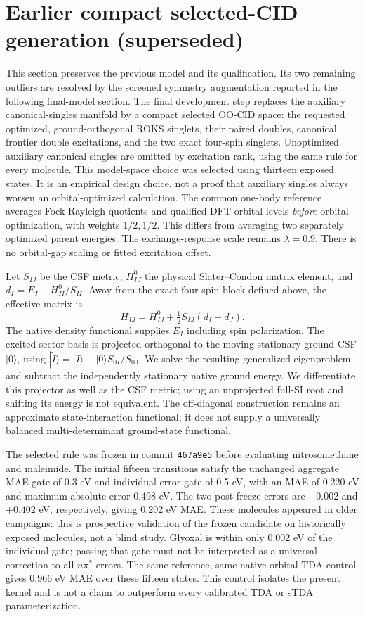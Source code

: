 \section{Earlier compact selected-CID generation (superseded)}
This section preserves the previous model and its qualification. Its two
remaining outliers are resolved by the screened symmetry augmentation
reported in the following final-model section.
The final development step replaces the auxiliary canonical-singles manifold
by a compact selected OO-CID space: the requested optimized, ground-orthogonal
ROKS singlets, their paired doubles, canonical frontier double excitations,
and the two exact four-spin singlets. Unoptimized auxiliary canonical singles
are omitted by excitation rank, using the same rule for every molecule.
This model-space choice was selected using thirteen exposed states. It is
an empirical design choice, not a proof that auxiliary singles always worsen
an orbital-optimized calculation. The common one-body reference averages
Fock Rayleigh quotients and qualified DFT orbital levels \emph{before} orbital
optimization, with weights $1/2,1/2$. This differs from averaging two separately
optimized parent energies. The exchange-response scale remains $\lambda=0.9$.
There is no orbital-gap scaling or fitted excitation offset.

Let $S_{IJ}$ be the CSF metric, $H^0_{IJ}$ the physical Slater--Condon
matrix element, and $d_I=E_I-H^0_{II}/S_{II}$. Away from the exact four-spin
block defined above, the effective matrix is
\begin{equation}
 H_{IJ}=H^0_{IJ}+\tfrac12 S_{IJ}(d_I+d_J).
\end{equation}
The native density functional supplies $E_I$ including spin polarization.
The excited-sector basis is projected orthogonal to the moving stationary
ground CSF $|0\rangle$, using
$|\widetilde I\rangle=|I\rangle-|0\rangle S_{0I}/S_{00}$.
We solve the resulting generalized eigenproblem and subtract the independently
stationary native ground energy. We differentiate this projector as well as
the CSF metric; using an unprojected full-SI root and shifting its energy is
not equivalent. The off-diagonal construction remains an approximate
state-interaction functional; it does not supply a universally balanced
multi-determinant ground-state functional.

The selected rule was frozen in commit \texttt{467a9e5} before evaluating
nitrosomethane and maleimide. The initial fifteen transitions satisfy the unchanged
aggregate MAE gate of 0.3 eV and individual error gate of 0.5 eV, with an MAE
of 0.220 eV and maximum absolute error 0.498 eV. The two post-freeze errors
are $-0.002$ and $+0.402$ eV, respectively, giving 0.202 eV MAE. These
molecules appeared in older campaigns: this is prospective validation of
the frozen candidate on historically exposed molecules, not a blind study.
Glyoxal is within only 0.002 eV of the individual gate; passing that gate
must not be interpreted as a universal correction to all $n\pi^*$ errors.
The same-reference, same-native-orbital TDA control gives 0.966 eV MAE over
these fifteen states. This control isolates the present kernel and is not
a claim to outperform every calibrated TDA or sTDA parameterization.


